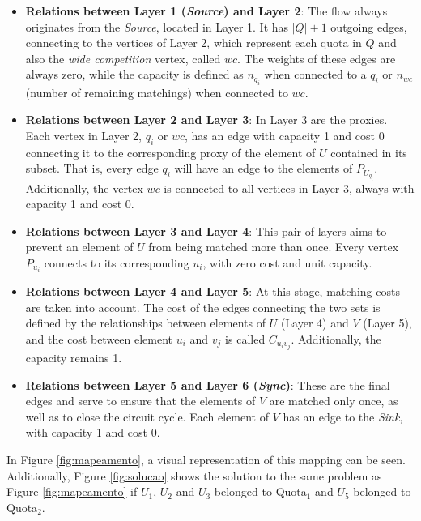             \begin{itemize}
                \item \textbf{Relations between Layer 1 (\textit{Source}) and Layer 2}: The flow always originates from the \textit{Source}, located in Layer 1. It has $|Q|+1$ outgoing edges, connecting to the vertices of Layer 2, which represent each quota in $Q$ and also the \textit{wide competition} vertex, called $wc$. The weights of these edges are always zero, while the capacity is defined as $n_{q_i}$ when connected to a $q_i$ or $n_{wc}$ (number of remaining matchings) when connected to $wc$.
                
                \item \textbf{Relations between Layer 2 and Layer 3}: In Layer 3 are the proxies. Each vertex in Layer 2, $q_i$ or $wc$, has an edge with capacity 1 and cost 0 connecting it to the corresponding proxy of the element of $U$ contained in its subset. That is, every edge $q_i$ will have an edge to the elements of $P_{U_{q_i}}$. Additionally, the vertex $wc$ is connected to all vertices in Layer 3, always with capacity 1 and cost 0.
                
                \item \textbf{Relations between Layer 3 and Layer 4}: This pair of layers aims to prevent an element of $U$ from being matched more than once. Every vertex $P_{u_i}$ connects to its corresponding $u_i$, with zero cost and unit capacity.
                
                \item \textbf{Relations between Layer 4 and Layer 5}: At this stage, matching costs are taken into account. The cost of the edges connecting the two sets is defined by the relationships between elements of $U$ (Layer 4) and $V$ (Layer 5), and the cost between element $u_i$ and $v_j$ is called $C_{u_i v_j}$. Additionally, the capacity remains 1.
                
                \item \textbf{Relations between Layer 5 and Layer 6 (\textit{Sync})}: These are the final edges and serve to ensure that the elements of $V$ are matched only once, as well as to close the circuit cycle. Each element of $V$ has an edge to the \textit{Sink}, with capacity 1 and cost 0.
            \end{itemize}
            
            In Figure \ref{fig:mapeamento}, a visual representation of this mapping can be seen. Additionally, Figure \ref{fig:solucao} shows the solution to the same problem as Figure \ref{fig:mapeamento} if $U_1$, $U_2$ and $U_3$ belonged to Quota$_1$ and $U_5$ belonged to Quota$_2$.
            
